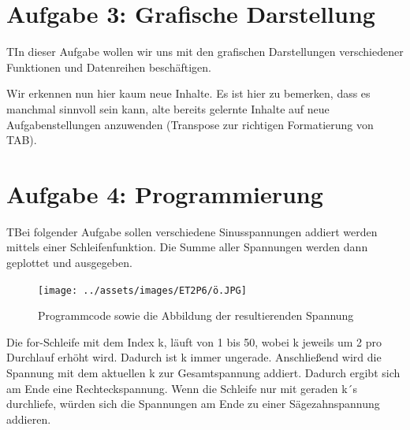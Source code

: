 \documentclass{article}
\begin{document}
\section{Aufgabe 3: Grafische Darstellung}

\begin{task}
  TIn dieser Aufgabe wollen wir uns mit den grafischen Darstellungen verschiedener Funktionen und Datenreihen beschäftigen.
\end{task}

Wir erkennen nun hier kaum neue Inhalte. Es ist hier zu bemerken, dass es manchmal sinnvoll sein kann, alte bereits gelernte Inhalte auf neue Aufgabenstellungen anzuwenden (Transpose zur richtigen Formatierung von TAB).


\newpage
\section{Aufgabe 4: Programmierung}
\begin{task}
  TBei folgender Aufgabe sollen verschiedene Sinusspannungen addiert werden mittels einer Schleifenfunktion. Die Summe aller Spannungen werden dann geplottet und ausgegeben.
\end{task}

\begin{figure}[h]
  \centering
  \texttt{[image: ../assets/images/ET2P6/ö.JPG]}
  \caption{Programmcode sowie die Abbildung der resultierenden Spannung}
\end{figure}

Die for-Schleife mit dem Index k, läuft von 1 bis 50, wobei k jeweils um 2 pro Durchlauf erhöht wird.
Dadurch ist k immer ungerade. Anschließend wird die Spannung mit dem aktuellen k zur Gesamtspannung addiert.
Dadurch ergibt sich am Ende eine Rechteckspannung.
Wenn die Schleife nur mit geraden k´s durchliefe, würden sich die Spannungen am Ende zu einer Sägezahnspannung addieren.
\end{document}

